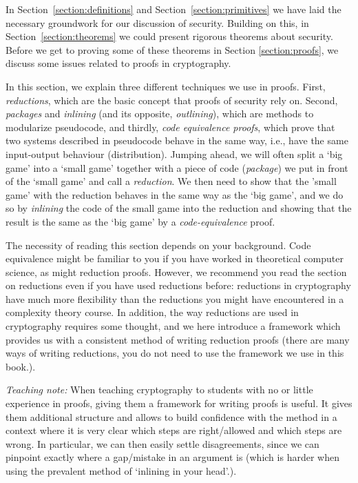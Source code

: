 In Section~\ref{section:definitions} and Section~\ref{section:primitives} we have laid the necessary groundwork for our discussion of security. Building on this, in Section~\ref{section:theorems} we could present rigorous theorems about security. Before we get to proving some of these theorems in Section \ref{section:proofs}, we discuss some issues related to proofs in cryptography.

In this section, we explain three different techniques we use in proofs. First, \emph{reductions}, which are the basic concept that proofs of security rely on. Second, \emph{packages} and \emph{inlining} (and its opposite, \emph{outlining}), which are methods to modularize pseudocode, and thirdly, \emph{code equivalence proofs}, which
prove that two systems described in pseudocode behave in the same way, i.e., have the same input-output behaviour (distribution). Jumping ahead, we will often split a `big game' into a `small game' together with a piece of code (\emph{package}) we put in front of the `small game' and call a \emph{reduction}. We then need to show that the 'small game' with the reduction behaves in the same way as the `big game', and we do so by \emph{inlining} the code of the small game into the reduction and showing that the result is the same as the `big game' by a \emph{code-equivalence} proof.


The necessity of reading this section depends on your background. Code equivalence might be familiar to you if you have worked in theoretical computer science, as might reduction proofs. However, we recommend you read the section on reductions even if you have used reductions before:
reductions in cryptography have much more flexibility than the reductions you might have encountered in a complexity theory course. In addition,
the way reductions are used in cryptography requires some thought, and we here introduce a framework which provides us with a consistent method  of writing reduction proofs (there are many ways of writing reductions, you do not need to use the framework we use in this book.).

\emph{Teaching note:} When teaching cryptography to students with no or little experience in proofs, giving them a framework for writing proofs is useful. It gives them additional structure and allows to build confidence with the method in a context where it is very clear which steps are right/allowed and which steps are wrong. In particular, we can then easily settle disagreements, since we can pinpoint exactly where a gap/mistake in an argument is (which is harder when using the prevalent method of `inlining in your head'.).